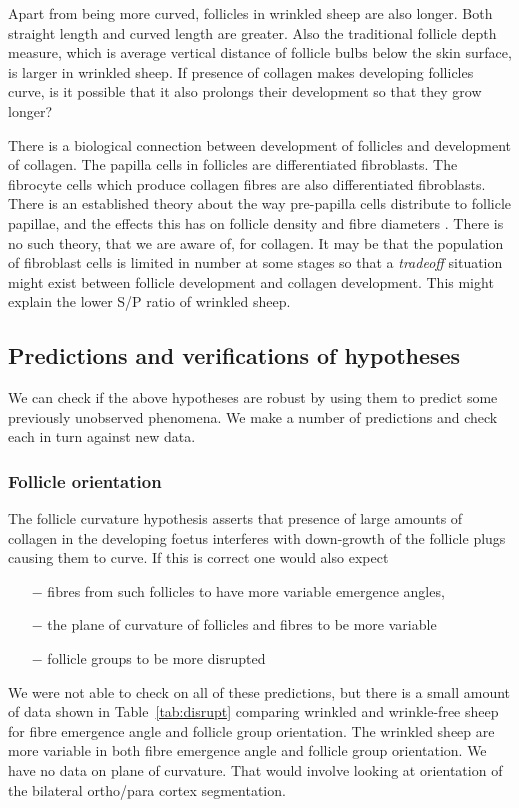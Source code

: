 \documentclass{article}
\begin{document}
Apart from being more curved, follicles in wrinkled sheep are also longer. Both straight length and curved length are greater. Also the traditional follicle depth measure, which is average vertical distance of follicle bulbs below the skin surface, is larger in wrinkled sheep.  If presence of collagen makes developing follicles curve, is it possible that it also prolongs their development so that they grow longer? 

There is a biological connection between development of follicles and development of collagen. The papilla cells in follicles are differentiated fibroblasts. The fibrocyte cells which produce collagen fibres are also differentiated fibroblasts.  There is an established theory about the way pre-papilla cells distribute to follicle papillae, and the effects this has on follicle density and fibre diameters \cite{moore-1989,moore-1996}. There is no such theory, that we are aware of, for collagen. It may be that the population of fibroblast cells is limited in number at some stages so that a {\em tradeoff} situation might exist between follicle development and collagen development. This might explain the lower S/P ratio of wrinkled sheep.

\subsection{Predictions and verifications of hypotheses}
We can check if the above hypotheses are robust by using them to predict some previously unobserved phenomena. We make a number of predictions and check each in turn against new data.


\subsubsection{Follicle orientation}
The follicle curvature hypothesis asserts that presence of large amounts of collagen in the developing foetus interferes with down-growth of the follicle plugs causing them to curve. If this is correct one would also expect 
\small
\begin{itemize}
\item[$-$] fibres from such follicles to have more variable emergence angles, 
\item[$-$] the plane of curvature of follicles and fibres to be more variable
\item[$-$] follicle groups to be more disrupted
\end{itemize}
\normalsize
We were not able to check on all of these predictions, but there is a small amount of data shown in Table~\ref{tab:disrupt} comparing wrinkled and wrinkle-free sheep for fibre emergence angle and follicle group orientation.
%
The wrinkled sheep are more variable in both fibre emergence angle and follicle group orientation. We have no data on plane of curvature. That would involve looking at orientation of the bilateral ortho/para cortex segmentation.
\end{document}
